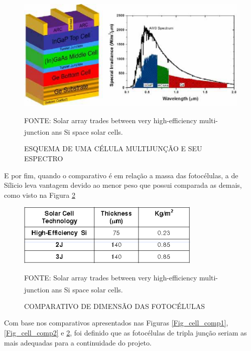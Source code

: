 \documentclass[
	12pt,				%
	openright,			%
	oneside,			%
	a4paper,			%
	english,			%
	french,				%
	spanish,			%
	brazil,				%
	oldfontcommands
	]{abntex2}
\begin{document}
	\begin{figure}[th]
		\caption{ESQUEMA DE UMA CÉLULA MULTIJUNÇÃO E SEU ESPECTRO}
		\label{Fig_cell_mult}
		\centering
		\includegraphics[width=1.05\linewidth]{./figs/cell_mult}
			
		\begin{small}
			FONTE: Solar array trades between very high-efficiency multi-junction ans Si space solar cells.\textsuperscript{\cite{Fatemi}}
		\end{small}		
	\end{figure}	
	
	E por fim, quando o comparativo é em relação a massa das fotocélulas, a de Sílicio leva vantagem devido ao menor peso que possui comparada as demais, como visto na Figura \ref{Fig_cell_comp3}
	
	\begin{figure}[th]
		\caption{COMPARATIVO DE DIMENSÃO DAS FOTOCÉLULAS}
		\label{Fig_cell_comp3}
		\centering
		\includegraphics[width=0.6\linewidth]{./figs/cell_comp3}
			
		\begin{small}
			FONTE: Solar array trades between very high-efficiency multi-junction ans Si space solar cells.\textsuperscript{\cite{Fatemi}}
		\end{small}		
	\end{figure}
	
	Com base nos comparativos apresentados nas Figuras \ref{Fig_cell_comp1}, \ref{Fig_cell_comp2} e \ref{Fig_cell_comp3}, foi definido que as fotocélulas de tripla junção seriam as mais adequadas para a continuidade do projeto.
	
\end{document}
